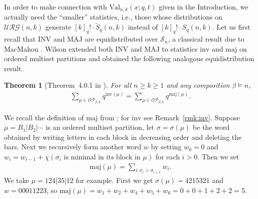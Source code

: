 \documentclass[12pt]{amsart}
\numberwithin{equation}{section}
\theoremstyle{plain}
\newtheorem{theorem}{Theorem}[section]
\theoremstyle{definition}
\def\inv{\mathrm{inv}}
\def\INV{\mathrm{INV}}
\def\MAJ{\mathrm{MAJ}}
\def\Val{\mathrm{Val}}
\def\maj{\mathrm{maj}}
\def\SS{\mathcal{S}}
\def\URG{\mathcal{URG}}
\def\OP{\mathcal{OP}}
\begin{document}
In order to make connection with $\Val_{n,k}(x;q,t)$ given in the Introduction, we actually need the ``smaller'' statistics, i.e., those whose distributions on $\URG(n,k)$ generate $[k]_q!\cdot\widetilde{S}_q(n,k)$ instead of $[k]_q!\cdot S_q(n,k)$. Let us first recall that $\INV$ and $\MAJ$ are equidistributed over $\SS_n$, a classical result due to MacMahon \cite{Ma}. Wilson \cite{Wils} extended both $\INV$ and $\MAJ$ to statistics $\inv$ and $\maj$ on ordered multiset partitions and obtained the following analogous equidistribution result.
\begin{theorem}[Theorem~4.0.1 in \cite{Wils}]\label{inv-maj on OMP}
For all $n\ge k\ge 1$ and any composition $\beta\models n$,
\begin{align*}
\sum_{\mu\in\OP_{\beta,k}}q^{\inv(\mu)}=\sum_{\mu\in\OP_{\beta,k}}q^{\maj(\mu)}.
\end{align*}
\end{theorem}

We recall the definition of $\maj$ from \cite{Wils}; for $\inv$ see Remark~\ref{rmk:inv}. Suppose $\mu=B_1|B_2|\cdots$ is an ordered multiset partition, let $\sigma=\sigma(\mu)$ be the word obtained by writing letters in each block in decreasing order and deleting the bars. Next we recursively form another word $w$ by setting $w_0=0$ and $w_i=w_{i-1}+\chi(\text{$\sigma_i$ is minimal in its block in $\mu$})$ for each $i>0$. Then we set
\begin{align*}
\maj(\mu)=\sum_{i: \sigma_i>\sigma_{i+1}}w_i.
\end{align*}
We take $\mu=124|35|12$ for example. First we get $\sigma(\mu)=4215321$ and $w=00011223$, so $\maj(\mu)=w_1+w_2+w_4+w_5+w_6=0+0+1+2+2=5$.
\end{document}
